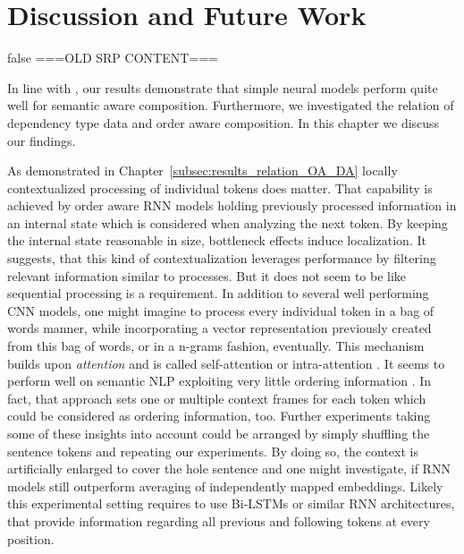\section{Discussion and Future Work}



\if false
===OLD SRP CONTENT===

In line with \textcite{mueller_siamese_2016,iyyer_deep_2015}, our results demonstrate that simple neural models perform quite well for semantic aware composition. Furthermore, we investigated the relation of dependency type data and order aware composition. In this chapter we discuss our findings.%

As demonstrated in Chapter~\ref{subsec:results_relation_OA_DA} locally contextualized processing of individual tokens does matter. That capability is achieved by order aware \ac{RNN} models holding previously processed information in an internal state which is considered when analyzing the next token. By keeping the internal state reasonable in size, bottleneck effects induce localization. It suggests, that this kind of contextualization leverages performance by filtering relevant information similar to processes. %
But it does not seem to be like sequential processing is a requirement. In addition to several well performing \ac{CNN} models, one might imagine to process every individual token in a bag of words manner, while incorporating a vector representation previously created from this bag of words, or in a n-grams fashion, eventually. This mechanism builds upon \textit{attention} \autocite{bahdanau_neural_2014, vaswani_attention_2017} and is called self-attention or intra-attention \autocite{cheng_long_2016}. It seems to perform well on semantic \ac{NLP} exploiting very little %
ordering information \autocite{parikh_decomposable_2016}. In fact, that approach sets one or multiple context frames for each token which could be considered as ordering information, too. %
Further experiments taking some of these insights into account could be arranged by simply shuffling the sentence tokens and repeating our experiments. By doing so, the context is artificially enlarged to cover the hole sentence and one might investigate, if \ac{RNN} models still outperform averaging of independently mapped embeddings. Likely this experimental setting requires to use Bi-LSTMs \autocite{graves_speech_2013} or similar \ac{RNN} architectures, that provide information regarding all previous and following tokens at every position. 

